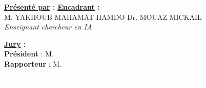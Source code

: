 \documentclass[12pt,a4paper]{report}
\begin{document}
\begin{titlepage}
\vspace{1cm}

\begin{flushleft}
  \textbf{\underline{Présenté par} :} \hspace{81mm} \textbf{\underline{Encadrant} :}\\[6pt]
  M. YAKHOUB MAHAMAT HAMDO \hspace{40mm} Dr. MOUAZ MICKAIL\\
  \hspace{107mm} {\small\textit{Enseignant chercheur en IA}}
\end{flushleft}

\vspace{3cm}

\begin{flushleft}
  \textbf{\underline{Jury} :}\\[6pt]
  \textbf{Président} : \hspace{5mm} M. \underline{\hspace{4cm}}\\[4pt]
  \textbf{Rapporteur} : \hspace{2mm} M. \underline{\hspace{4cm}}
\end{flushleft}

\vspace{1cm}

\begin{center}
  \begin{tcolorbox}[
    enhanced,
    colback=darkblue,
    colframe=gold,
    arc=20pt,
    boxrule=1.5pt,
    width=0.6\textwidth,
    halign=center
  ]
    \textcolor{white}{\textbf{\large Année Universitaire : 2025--2026}}
  \end{tcolorbox}
\end{center}

\end{titlepage}

\end{document}
